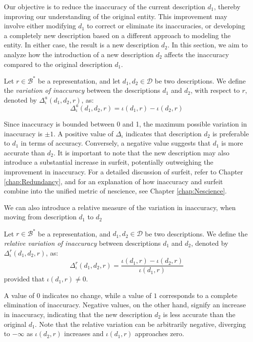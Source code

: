 Our objective is to reduce the inaccuracy of the current description $d_1$, thereby improving our understanding of the original entity. This improvement may involve either modifying $d_1$ to correct or eliminate its inaccuracies, or developing a completely new description based on a different approach to modeling the entity. In either case, the result is a new description $d_2$. In this section, we aim to analyze how the introduction of a new description $d_2$ affects the inaccuracy compared to the original description $d_1$.

\begin{definition}
Let $r \in \mathcal{B}^\ast$ be a representation, and let $d_1, d_2 \in \mathcal{D}$ be two descriptions. We define the \emph{variation of inaccuracy} between the descriptions $d_1$ and $d_2$, with respect to $r$, denoted by $\Delta^{a}_{\iota} ( d_1, d_2, r )$, as:
\[
\Delta^{a}_{\iota} ( d_1, d_2, r ) = \iota(d_1, r) - \iota(d_2, r)
\]
\end{definition}

Since inaccuracy is bounded between 0 and 1, the maximum possible variation in inaccuracy is $\pm 1$. A positive value of $\Delta_{\iota}$ indicates that description $d_2$ is preferable to $d_1$ in terms of accuracy. Conversely, a negative value suggests that $d_1$ is more accurate than $d_2$. It is important to note that the new description may also introduce a substantial increase in surfeit, potentially outweighing the improvement in inaccuracy. For a detailed discussion of surfeit, refer to Chapter \ref{chap:Redundancy}, and for an explanation of how inaccuracy and surfeit combine into the unified metric of nescience, see Chapter \ref{chap:Nescience}.

We can also introduce a relative measure of the variation in inaccuracy, when moving from description $d_1$ to $d_2$

\begin{definition}
Let $r \in \mathcal{B}^\ast$ be a representation, and $d_1, d_2 \in \mathcal{D}$ be two descriptions. We define the \emph{relative variation of inaccuracy} between descriptions $d_1$ and $d_2$, denoted by $\Delta^{r}_{\iota}(d_1, d_2, r)$, as:
\[
\Delta^{r}_{\iota}(d_1, d_2, r) = \frac{\iota(d_1, r) - \iota(d_2, r)}{\iota(d_1, r)}
\]
provided that $\iota(d_1, r) \neq 0$.
\end{definition}

A value of $0$ indicates no change, while a value of $1$ corresponds to a complete elimination of inaccuracy. Negative values, on the other hand, signify an increase in inaccuracy, indicating that the new description $d_2$ is less accurate than the original $d_1$. Note that the relative variation can be arbitrarily negative, diverging to $-\infty$ as $\iota(d_2, r)$ increases and $\iota(d_1, r)$ approaches zero.

